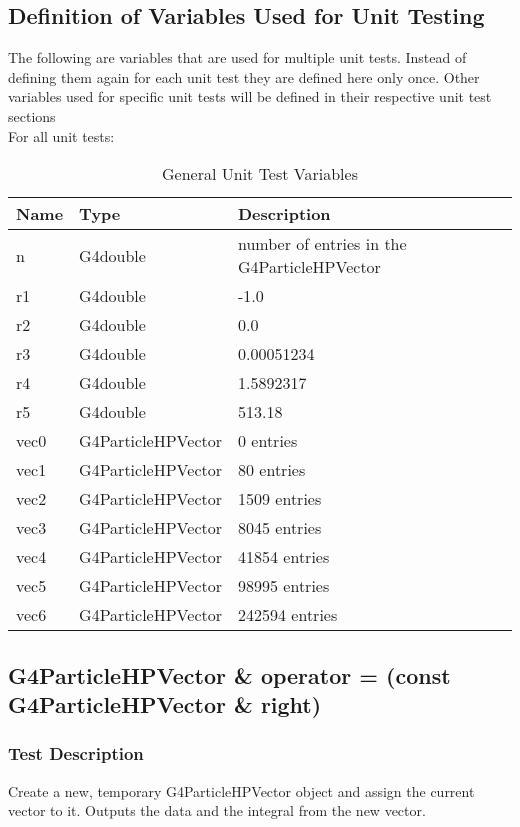 \documentclass[12pt]{article}
\newcommand{\todo}[1]{\textcolor{red}{[TODO: #1]}} \else
\newcommand{\authornote}[3]{} \newcommand{\todo}[1]{} \fi
\newcommand{\ds}[1]{\authornote{blue}{DS}{#1}}
\newcommand{\mmp}[1]{\authornote{green}{MP}{#1}}
\begin{document}
\subsection{Definition of Variables Used for Unit Testing}
The following are variables that are used for multiple unit tests. Instead of defining them again for each unit test they are defined here only once. Other variables used for specific unit tests will be defined in their respective unit test sections\\
For all unit tests:
\begin{table}[H]
\centering
\caption{General Unit Test Variables}\label{gen_var_table}
\begin{tabular}{lll}
\toprule
	\bf Name & \bf Type & \bf Description\\\midrule
	n 	& G4double 			& number of entries in the G4ParticleHPVector\\
	r1 	& G4double 			& -1.0\\
	r2	& G4double			& 0.0\\
	r3 	& G4double 			& 0.00051234\\
	r4 	& G4double 			& 1.5892317\\
	r5 	& G4double 			& 513.18\\
	vec0 & G4ParticleHPVector 	& 0 entries\\
	vec1 & G4ParticleHPVector	& 80 entries\\
	vec2 & G4ParticleHPVector 	& 1509 entries\\
	vec3 & G4ParticleHPVector 	& 8045 entries\\
	vec4 & G4ParticleHPVector 	& 41854 entries\\
	vec5 & G4ParticleHPVector 	& 98995 entries\\
	vec6 & G4ParticleHPVector 	& 242594 entries\\
\bottomrule		
\end{tabular}
\end{table}

\ds{What unit testing framework are you planning to use?} \mmp{Mentioned that we will be making our own unit testing framework}

\subsection{G4ParticleHPVector \& operator = (const G4ParticleHPVector \& right)}
	\subsubsection{Test Description}
	Create a new, temporary G4ParticleHPVector object and assign the current vector to it. Outputs the data and the integral from the new vector.
\end{document}
